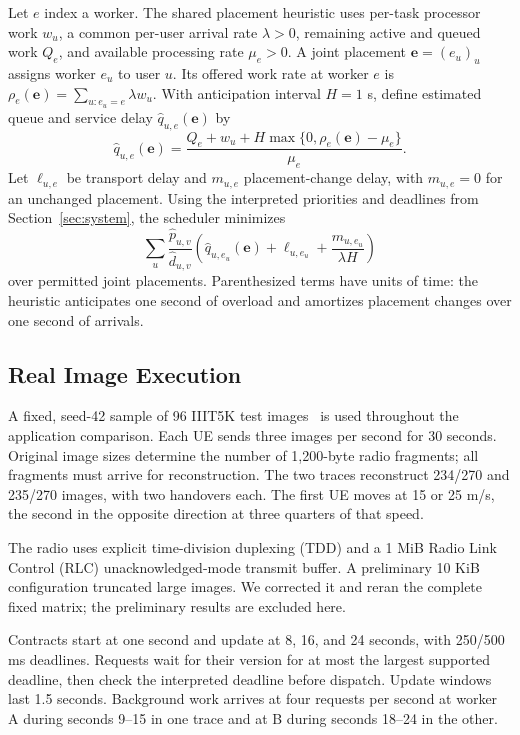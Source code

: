 Let $e$ index a worker. The shared placement heuristic uses per-task processor work $w_u$, a common per-user arrival rate $\lambda>0$, remaining active and queued work $Q_e$, and available processing rate $\mu_e>0$. A joint placement $\mathbf e=(e_u)_u$ assigns worker $e_u$ to user $u$. Its offered work rate at worker $e$ is $\rho_e(\mathbf e)=\sum_{u:e_u=e}\lambda w_u$. With anticipation interval $H=1$ s, define estimated queue and service delay $\widehat q_{u,e}(\mathbf e)$ by
\begin{equation}
\widehat q_{u,e}(\mathbf e)=
\frac{Q_e+w_u+H\max\{0,\rho_e(\mathbf e)-\mu_e\}}{\mu_e}.
\end{equation}
Let $\ell_{u,e}$ be transport delay and $m_{u,e}$ placement-change delay, with $m_{u,e}=0$ for an unchanged placement. Using the interpreted priorities and deadlines from Section~\ref{sec:system}, the scheduler minimizes
\begin{equation}
\sum_u \frac{\widehat p_{u,v}}{\widehat d_{u,v}}
\left(\widehat q_{u,e_u}(\mathbf e)+\ell_{u,e_u}
+\frac{m_{u,e_u}}{\lambda H}\right)
\end{equation}
over permitted joint placements. Parenthesized terms have units of time: the heuristic anticipates one second of overload and amortizes placement changes over one second of arrivals.

\subsection{Real Image Execution}
A fixed, seed-42 sample of 96 IIIT5K test images~\cite{mishra2012scene} is used throughout the application comparison. Each UE sends three images per second for 30 seconds. Original image sizes determine the number of 1,200-byte radio fragments; all fragments must arrive for reconstruction. The two traces reconstruct 234/270 and 235/270 images, with two handovers each. The first UE moves at 15 or 25 m/s, the second in the opposite direction at three quarters of that speed.

The radio uses explicit time-division duplexing (TDD) and a 1 MiB Radio Link Control (RLC) unacknowledged-mode transmit buffer. A preliminary 10 KiB configuration truncated large images. We corrected it and reran the complete fixed matrix; the preliminary results are excluded here.

Contracts start at one second and update at 8, 16, and 24 seconds, with 250/500 ms deadlines. Requests wait for their version for at most the largest supported deadline, then check the interpreted deadline before dispatch. Update windows last 1.5 seconds. Background work arrives at four requests per second at worker A during seconds 9--15 in one trace and at B during seconds 18--24 in the other.


